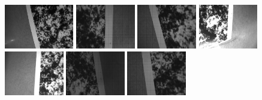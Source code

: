 \documentclass{report}
\begin{document}
\begin{figure}
\centering
\includegraphics[width=0.27\textwidth]{images/cam4rig/1} \includegraphics[width=0.23\textwidth]{images/cam4rig/2} \hspace{0.5pt}
\includegraphics[width=0.23\textwidth]{images/cam4rig/3}
\includegraphics[width=0.23\textwidth]{images/cam4rig/4} \\
\vspace{5pt}
\includegraphics[width=0.23\textwidth]{images/cam4rig/5} \includegraphics[width=0.23\textwidth]{images/cam4rig/6} \hspace{0.5pt}
\includegraphics[width=0.23\textwidth]{images/cam4rig/7}

\end{figure}
\end{document}
